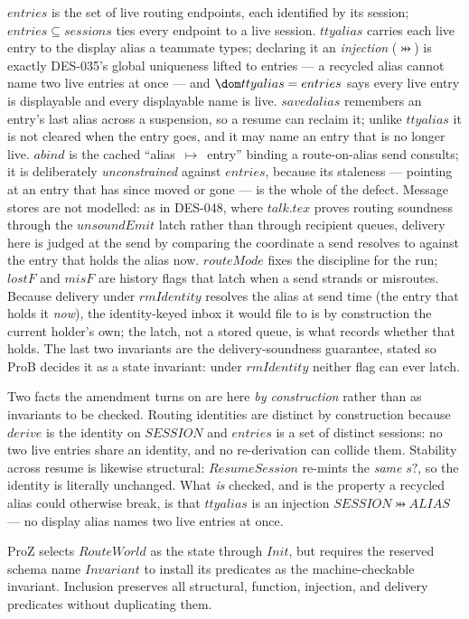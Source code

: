 \documentclass[a4paper,10pt,fleqn]{article}
\begin{document}
$entries$ is the set of live routing endpoints, each identified by its
session; $entries \subseteq sessions$ ties every endpoint to a live
session.  $ttyalias$ carries each live entry to the display alias a
teammate types; declaring it an \emph{injection} ($\pinj$) is exactly
DES-035's global uniqueness lifted to entries --- a recycled alias
cannot name two live entries at once --- and $\dom ttyalias = entries$
says every live entry is displayable and every displayable name is live.
$savedalias$ remembers an entry's last alias across a suspension, so a
resume can reclaim it; unlike $ttyalias$ it is not cleared when the entry
goes, and it may name an entry that is no longer live.  $abind$ is the
cached ``alias~$\mapsto$~entry'' binding a route-on-alias send consults;
it is deliberately \emph{unconstrained} against $entries$, because its
staleness --- pointing at an entry that has since moved or gone --- is
the whole of the defect.  Message stores are not modelled: as in DES-048,
where $talk.tex$ proves routing soundness through the $unsoundEmit$ latch
rather than through recipient queues, delivery here is judged at the send
by comparing the coordinate a send resolves to against the entry that
holds the alias now.  $routeMode$ fixes the discipline for the run;
$lostF$ and $misF$ are history flags that latch when a send strands or
misroutes.  Because delivery under $rmIdentity$ resolves the alias at
send time (the entry that holds it \emph{now}), the identity-keyed inbox
it would file to is by construction the current holder's own; the latch,
not a stored queue, is what records whether that holds.  The last two
invariants are the delivery-soundness guarantee, stated so ProB decides
it as a state invariant: under $rmIdentity$ neither flag can ever latch.

Two facts the amendment turns on are here \emph{by construction} rather
than as invariants to be checked.  Routing identities are distinct by
construction because $derive$ is the identity on $SESSION$ and $entries$
is a set of distinct sessions: no two live entries share an identity, and
no re-derivation can collide them.  Stability across resume is likewise
structural: $ResumeSession$ re-mints the \emph{same} $s?$, so the identity
is literally unchanged.  What \emph{is} checked, and is the property a
recycled alias could otherwise break, is that $ttyalias$ is an injection
$SESSION \pinj ALIAS$ --- no display alias names two live entries at
once.

ProZ selects $RouteWorld$ as the state through $Init$, but requires the
reserved schema name $Invariant$ to install its predicates as the
machine-checkable invariant.  Inclusion preserves all structural,
function, injection, and delivery predicates without duplicating them.
\end{document}
